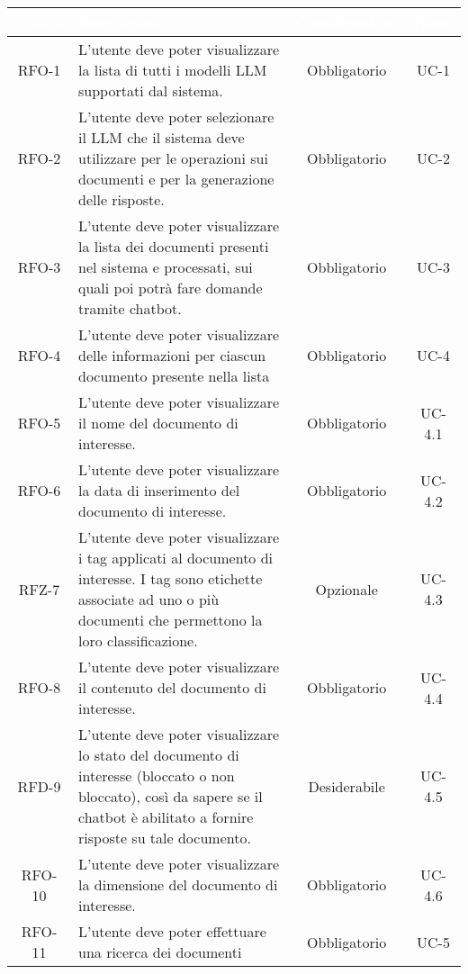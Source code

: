 \begingroup
\setlength{\tabcolsep}{10pt}
\renewcommand{\arraystretch}{1.5}
\begin{xltabular}{\textwidth}{| c | X | c | c |}
    \hline
     \textbf{\textcolor{white}{Codice}} & \textbf{\textcolor{white}{Descrizione}} & \textbf{\textcolor{white}{Classificazione}} & \textbf{\textcolor{white}{Fonte}}\\
    \hline
    \endhead
    RFO-1 & L’utente deve poter visualizzare la lista di tutti i modelli LLM supportati dal sistema. & Obbligatorio & UC-1 \\
    \hline
    RFO-2 & L’utente deve poter selezionare il LLM che il sistema deve utilizzare per le operazioni sui documenti e per la generazione delle risposte. & Obbligatorio & UC-2 \\
    \hline
    RFO-3 & L’utente deve poter visualizzare la lista dei documenti presenti nel sistema e processati, sui quali poi potrà fare domande tramite chatbot. & Obbligatorio & UC-3 \\
    \hline
    RFO-4 & L'utente deve poter visualizzare delle informazioni per ciascun documento presente nella lista & Obbligatorio & UC-4 \\
    \hline
    RFO-5 & L'utente deve poter visualizzare il nome del documento di interesse. & Obbligatorio & UC-4.1 \\
    \hline
    RFO-6 & L’utente deve poter visualizzare la data di inserimento del documento di interesse. & Obbligatorio & UC-4.2 \\
    \hline
    RFZ-7 & L’utente deve poter visualizzare i tag applicati al documento di interesse. I tag sono etichette associate ad uno o più documenti che permettono la loro classificazione. & Opzionale & UC-4.3 \\
    \hline
    RFO-8 & L’utente deve poter visualizzare il contenuto del documento di interesse. & Obbligatorio & UC-4.4 \\
    \hline
    RFD-9 & L’utente deve poter visualizzare lo stato del documento di interesse (bloccato o non bloccato), così da sapere se il chatbot è abilitato a fornire risposte su tale documento. & Desiderabile & UC-4.5 \\
    \hline
    RFO-10 & L’utente deve poter visualizzare la dimensione del documento di interesse. & Obbligatorio & UC-4.6 \\
    \hline
    RFO-11 & L’utente deve poter effettuare una ricerca dei documenti & Obbligatorio & UC-5 \\
    \hline

\end{xltabular}
